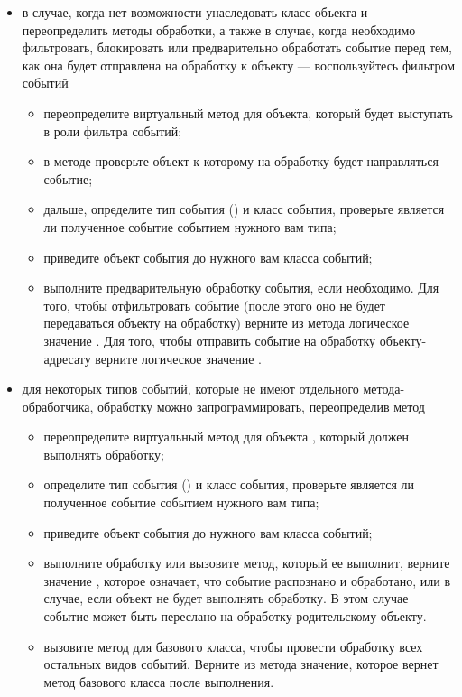 \begin{itemize}
\item в случае, когда нет возможности унаследовать класс объекта и переопределить методы обработки, а также в случае,
когда необходимо фильтровать, блокировать или предварительно обработать событие перед тем, как она будет отправлена на
обработку к объекту --- воспользуйтесь фильтром событий
 \begin{itemize}
 \item переопределите виртуальный метод  для объекта, который будет выступать в
 роли фильтра событий;
 \item в методе  проверьте объект к которому на обработку будет направляться событие;
 \item дальше, определите тип события () и класс события, проверьте является ли полученное
 событие событием нужного вам типа;
 \item приведите объект события до нужного вам класса событий;
 \item выполните предварительную обработку события, если необходимо. Для того, чтобы отфильтровать событие (после этого
 оно не будет передаваться объекту на обработку) верните из метода логическое значение . Для того, чтобы отправить
 событие на обработку объекту-адресату верните логическое значение .
 \end{itemize}

\item для некоторых типов событий, которые не имеют отдельного метода-обработчика, обработку можно запрограммировать,
переопределив метод  
 \begin{itemize}
 \item переопределите виртуальный метод для объекта , который должен выполнять обработку;
 \item определите тип события () и класс события, проверьте является  ли полученное событие
 событием нужного вам типа;
 \item приведите объект события до нужного вам класса событий;
 \item выполните обработку или вызовите метод, который ее выполнит, верните значение , которое означает, что событие
 распознано и обработано, или  в случае, если объект не будет выполнять обработку. В этом случае событие может быть
 переслано на обработку родительскому объекту.
 \item вызовите метод  для базового класса, чтобы провести обработку всех остальных видов событий.
 Верните из метода значение, которое вернет метод  базового класса после выполнения.
\end{itemize}


\end{itemize}
